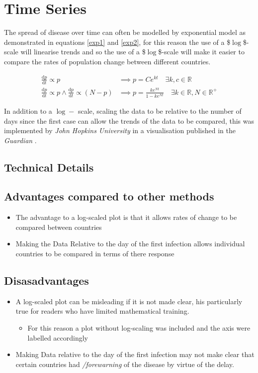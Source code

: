 \documentclass[11pt]{article}
\begin{document}
\section{Time Series}
\label{sec:orgd18e079}
The spread of disease over time can often be modelled by exponential model as demonstrated in equations \eqref{exp1} and \eqref{exp2}, for this reason the use of a \$\(\log\)\$-scale will linearise trends and so the use of a \$\(\log\)\$-scale will make it easier to compare the rates of population change between different countries.



\begin{align}
  \frac{\mathrm{d} p}{\mathrm{d} t} \propto p &\implies p = Ce^{kt} \quad \exists k,c \in \mathbb{R} \label{exp1} \\
  \frac{\mathrm{d} p}{\mathrm{d} t} \propto p \wedge    \frac{\mathrm{d} p}{\mathrm{d} t} \propto (N-p) &\implies p = \frac{ke^{Nt}}{1-ke^{Nt}} \quad \exists k \in \mathbb{R}, N \in \mathbb{R^+} \label{exp1} \label{exp2}
\end{align}

In addition to a \(\log-\) scale, scaling the data to be relative to the number of days since the first case can allow the trends of the data to be compared, this was implemented by \emph{John Hopkins University} in a visualisation published in the \emph{Guardian} \cite{gutierrez2020}. \label{orgda7745e}

\subsection{Technical Details}
\label{sec:org190a922}

\subsection{Advantages compared to other methods}
\label{sec:orgd3a1d68}
\begin{itemize}
\item The advantage to a log-scaled plot is that it allows rates of change to be
compared between countries
\item Making the Data Relative to the day of the first infection allows individual
countries to be compared in terms of there response
\end{itemize}
\subsection{Disasadvantages}
\label{sec:org09b797c}
\begin{itemize}
\item A log-scaled plot can be misleading if it is not made clear, his particularly
true for readers who have limited mathematical training.
\begin{itemize}
\item For this reason a plot without log-scaling was included and the axis were
labelled accordingly
\end{itemize}
\item Making Data relative to the day of the first infection may not make clear that
certain countries had \emph{/forewarning} of the disease by virtue of the delay.
\end{itemize}
\end{document}
